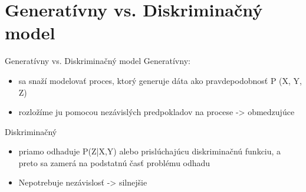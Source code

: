 \documentclass[xcolor=dvipsnames, compress]{beamer}
\begin{document}
\section[Modely]{Generatívny vs. Diskriminačný model}
\begin{frame}{Generatívny vs. Diskriminačný model}
Generatívny:
\begin{itemize}
\item sa snaží modelovať proces, ktorý generuje dáta ako pravdepodobnosť P (X, Y, Z)
\item rozložíme ju pomocou nezávislých predpokladov na procese -> obmedzujúce
\end{itemize} 
Diskriminačný
\begin{itemize}
\item priamo odhaduje P(Z|X,Y) alebo prislúchajúcu diskriminačnú funkciu, a preto sa zamerá na podstatnú časť problému odhadu
\item Nepotrebuje nezávislosť -> silnejšie
\end{itemize}   
\end{frame}






\end{document}
